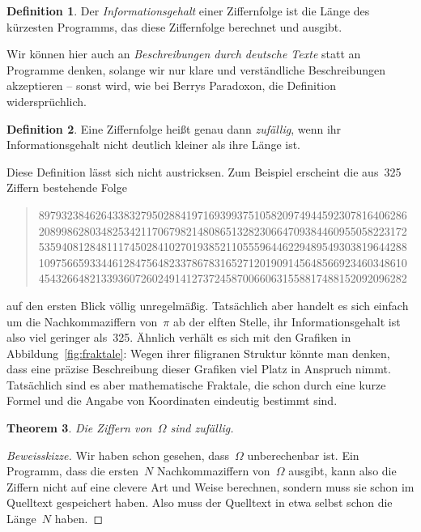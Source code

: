 \documentclass[twoside]{../zirkelblatt1415}
\theoremstyle{definition}
\newtheorem{defn}{Definition}[section]
\theoremstyle{plain}
\newtheorem{thm}[defn]{Theorem}
\theoremstyle{remark}
\begin{document}
\begin{defn}Der \emph{Informationsgehalt} einer Ziffernfolge ist die Länge des
kürzesten Programms, das diese Ziffernfolge berechnet und ausgibt.\end{defn}

Wir können hier auch an \emph{Beschreibungen durch deutsche Texte} statt an
Programme denken, solange wir nur klare und verständliche Beschreibungen
akzeptieren -- sonst wird, wie bei Berrys Paradoxon, die Definition
widersprüchlich.

\begin{defn}Eine Ziffernfolge heißt genau dann \emph{zufällig}, wenn ihr
Informationsgehalt nicht deutlich kleiner als ihre Länge ist.\end{defn}

Diese Definition lässt sich nicht austricksen. Zum Beispiel erscheint die
aus~325 Ziffern bestehende Folge
\begin{quote}
89793238462643383279502884197169399375105820974944592307816406286 \\
20899862803482534211706798214808651328230664709384460955058223172 \\
53594081284811174502841027019385211055596446229489549303819644288 \\
10975665933446128475648233786783165271201909145648566923460348610 \\
45432664821339360726024914127372458700660631558817488152092096282
\end{quote}

auf den ersten Blick völlig unregelmäßig. Tatsächlich aber handelt es sich
einfach um die Nachkommaziffern von~$\pi$ ab der elften Stelle, ihr
Informationsgehalt ist also viel geringer als~325. Ähnlich verhält es sich mit
den Grafiken in Abbildung~\ref{fig:fraktale}: Wegen ihrer filigranen Struktur könnte man denken, dass
eine präzise Beschreibung dieser Grafiken viel Platz in Anspruch nimmt.
Tatsächlich sind es aber mathematische Fraktale, die schon durch eine kurze
Formel und die Angabe von Koordinaten eindeutig bestimmt sind.

\begin{thm}Die Ziffern von~$\Omega$ sind zufällig.\end{thm}
\begin{proof}[Beweisskizze]Wir haben schon gesehen, dass~$\Omega$ unberechenbar
ist. Ein Programm, dass die ersten~$N$ Nachkommaziffern von~$\Omega$ ausgibt,
kann also die Ziffern nicht auf eine clevere Art und Weise berechnen, sondern
muss sie schon im Quelltext gespeichert haben. Also muss der Quelltext in etwa
selbst schon die Länge~$N$ haben.
\end{proof}
\end{document}
